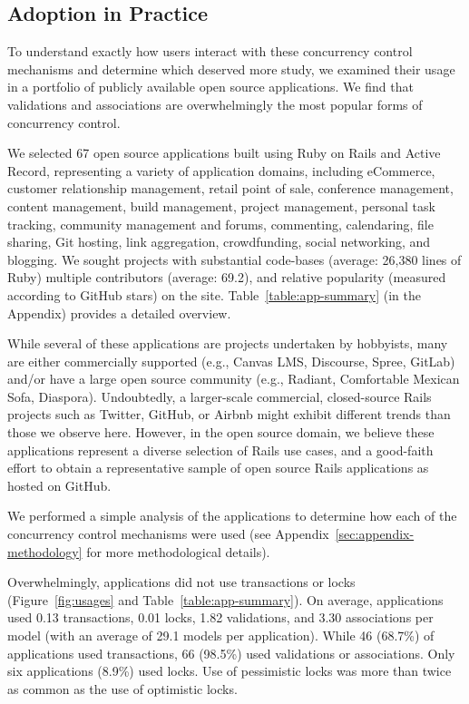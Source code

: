 \subsection{Adoption in Practice}

To understand exactly how users interact with these
concurrency control mechanisms and determine which deserved more
study, we examined their usage in a portfolio of publicly available
open source applications. We find that validations and associations
are overwhelmingly the most popular forms of concurrency control.

 We selected 67 open source applications
built using Ruby on Rails and Active Record, representing a variety of
application domains, including eCommerce, customer relationship
management, retail point of sale, conference management, content
management, build management, project management, personal task
tracking, community management and forums, commenting, calendaring,
file sharing, Git hosting, link aggregation, crowdfunding, social
networking, and blogging. We sought projects with substantial
code-bases (average: 26,380 lines of Ruby) multiple contributors
(average: 69.2), and relative popularity (measured according to GitHub
stars) on the site. Table~\ref{table:app-summary} (in the Appendix)
provides a detailed overview.


While several of these applications are projects undertaken by
hobbyists, many are either commercially supported (e.g., Canvas LMS,
Discourse, Spree, GitLab) and/or have a large open source community
(e.g., Radiant, Comfortable Mexican Sofa, Diaspora). Undoubtedly, a
larger-scale commercial, closed-source Rails projects such as Twitter,
GitHub, or Airbnb might exhibit different trends than those we observe
here. However, in the open source domain, we believe these
applications represent a diverse selection of Rails use cases, and a
good-faith effort to obtain a representative sample of open source
Rails applications as hosted on GitHub.

 We performed a simple analysis of the
applications to determine how each of the concurrency control
mechanisms were used (see Appendix~\ref{sec:appendix-methodology} for more
methodological details).

Overwhelmingly, applications did not use transactions or locks
(Figure~\ref{fig:usages} and Table~\ref{table:app-summary}). On
average, applications used 0.13 transactions, 0.01 locks, 1.82
validations, and 3.30 associations per model (with an average of 29.1
models per application). While 46 (68.7\%) of applications used
transactions, 66 (98.5\%) used validations or associations. Only six
applications (8.9\%) used locks. Use of pessimistic locks was more than
twice as common as the use of optimistic locks.

